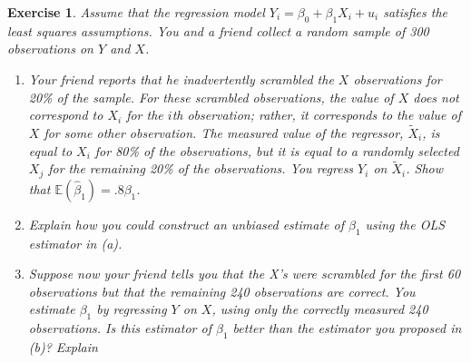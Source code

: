 \documentclass{article}
\newtheorem{exercise}[theorem]{Exercise}
\begin{document}
\begin{exercise}%
Assume that the regression model $Y_i = \beta_0 + \beta_1X_i + u_i$ satisfies the least squares assumptions. You and a friend collect a random sample of 300 observations on $Y$ and $X$.
\begin{enumerate}[label=\alph*)]
    \item Your friend reports that he inadvertently scrambled the $X$ observations for 20\% of the sample. For these scrambled observations, the value of $X$ does not correspond to $X_i$ for the $i$th observation; rather, it corresponds to the value of $X$ for some other observation. The measured value of the regressor, $\tilde{X}_i$, is equal to $X_i$ for 80\% of the observations, but it is equal to a randomly selected $X_j$ for the remaining 20\% of the observations. You regress $Y_i$ on $\tilde{X}_i$. Show that $\mathbb{E}(\hat{\beta}_1)=.8\beta_1$.
    \item Explain how you could construct an unbiased estimate of $\beta_1$ using the OLS estimator in (a).
    \item Suppose now your friend tells you that the X’s were scrambled for the first 60 observations but that the remaining 240 observations are correct. You estimate $\beta_1$ by regressing $Y$ on $X$, using only the correctly measured 240 observations. Is this estimator of $\beta_1$ better than the estimator you proposed in (b)? Explain
\end{enumerate}
\end{exercise}
\vspace{.5cm}
\end{document}
